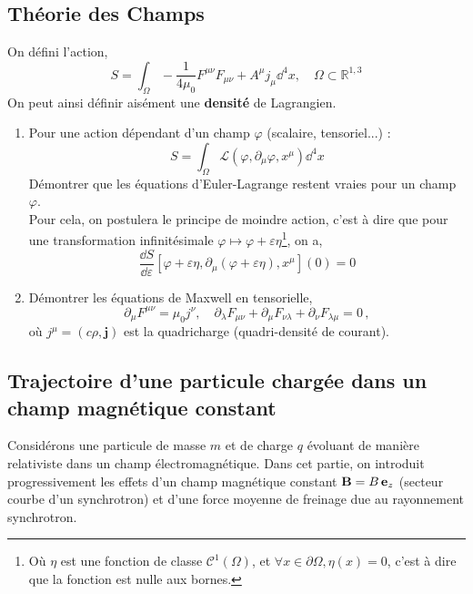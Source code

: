\documentclass[a4paper,10pt]{report}
\newcommand{\RR}{\mathbb{R}}
\begin{document}
\subsection{Théorie des Champs}
On défini l'action,
$$S = \int_\Omega- \frac{1} {4\mu_0} F^{\mu\nu}F_{\mu \nu} + A^\mu j_\mu \dd ^4x, \quad \Omega \subset \RR^{1,3} $$
On peut ainsi définir aisément une \textbf{densité} de Lagrangien.
\begin{enumerate}
\item Pour une action dépendant d'un champ $\varphi$ (scalaire, tensoriel...) : \begin{equation*}
	S = \int_\Omega \mathcal L (\varphi, \partial_\mu\varphi, x^\mu) \dd^4 x 
\end{equation*}
Démontrer que les équations d'Euler-Lagrange restent vraies pour un champ $\varphi$. \\
Pour cela, on postulera le principe de moindre action, c'est à dire que pour une transformation infinitésimale $ \varphi \mapsto \varphi + \varepsilon \eta$\footnote{Où $\eta$ est une fonction de classe $\mathcal{C}^1(\Omega)$, et $\forall x \in \partial \Omega, \eta(x) = 0$, c'est à dire que la fonction est nulle aux bornes.}, on a,
\begin{equation*}
	\frac{\dd S}{\dd \varepsilon}[\varphi + \varepsilon \eta, \partial_\mu(\varphi + \varepsilon \eta), x^\mu](0) = 0
\end{equation*}

\item Démontrer les équations de Maxwell en tensorielle, 
\[
\partial_\mu F^{\mu\nu} = \mu_0 j^\nu, 
\quad
\partial_\lambda F_{\mu\nu} + \partial_\mu F_{\nu\lambda} + \partial_\nu F_{\lambda\mu} = 0
\,,
\]
où $j^\mu=(c\rho,\textbf{j})$ est la quadricharge (quadri-densité de courant).
\end{enumerate}

\subsection{Trajectoire d'une particule chargée dans un champ magnétique constant}

Considérons une particule de masse $m$ et de charge $q$ évoluant de manière relativiste dans un champ électromagnétique. Dans cet partie, on introduit progressivement les effets d’un champ magnétique constant $\textbf B = B\,\textbf{e}_z$ (secteur courbe d’un synchrotron) et d’une force moyenne de freinage due au rayonnement synchrotron. 
 
\end{document}

